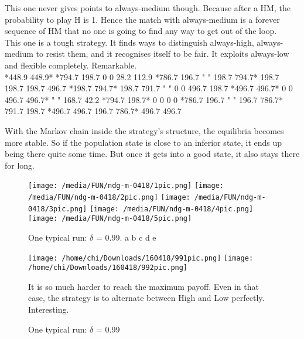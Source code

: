 \documentclass[12.5pt]{report}
\begin{document}
This one never gives points to always-medium though. Because after a HM, the probability to play H is 1. Hence the match with always-medium is a forever sequence of HM that no one is going to find any way to get out of the loop.\\

This one is a tough strategy. It finds ways to distinguish always-high, always-medium to resist them, and it recognises itself to be fair. It exploits always-low and flexible completely. Remarkable.\\







*448.9 448.9*  *794.7 198.7        0 0        28.2 112.9    *786.7 196.7  "
  "  198.7 794.7*   198.7 198.7    198.7 496.7   *198.7 794.7*   198.7 791.7  "
  "      0 0        496.7 198.7   *496.7 496.7*       0 0        496.7 496.7* "
  "  168.7 42.2    *794.7 198.7*       0 0            0 0       *786.7 196.7  "
  "  196.7 786.7*   791.7 198.7   *496.7 496.7    196.7 786.7*   496.7 496.7
  
  
  
  
  
  
  
  
  
  
  
  
  
  










With the Markov chain inside the strategy's structure, the equilibria becomes more stable. So if the population state is close to an inferior state, it ends up being there quite some time. But once it gets into a good state, it also stays there for long.


\begin{figure}
\texttt{[image: /media/FUN/ndg-m-0418/1pic.png]}
\texttt{[image: /media/FUN/ndg-m-0418/2pic.png]}
\texttt{[image: /media/FUN/ndg-m-0418/3pic.png]}
\texttt{[image: /media/FUN/ndg-m-0418/4pic.png]}
\texttt{[image: /media/FUN/ndg-m-0418/5pic.png]}

\caption{One typical run: $\delta$ = 0.99. a b c d e}
\end{figure}


\begin{figure}
\texttt{[image: /home/chi/Downloads/160418/991pic.png]}
\texttt{[image: /home/chi/Downloads/160418/992pic.png]}

It is so much harder to reach the maximum payoff. Even in that case, the strategy is to alternate between High and Low perfectly. Interesting.


\caption{One typical run: $\delta$ = 0.99}
\end{figure}
\end{document}

